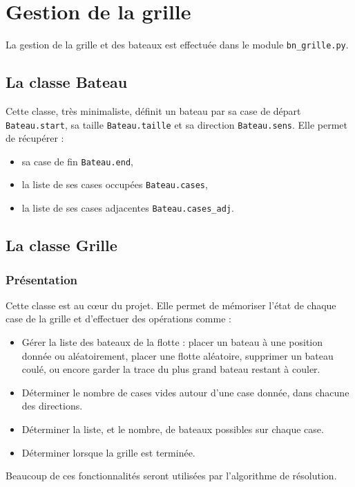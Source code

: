 \chapter{Gestion de la grille}\label{chap_grille}

La gestion de la grille et des bateaux est effectuée dans le module \texttt{bn\_grille.py}.

\section{La classe Bateau}
Cette classe, très minimaliste, définit un bateau par sa case de départ \texttt{Bateau.start}, sa taille \texttt{Bateau.taille} et sa direction \texttt{Bateau.sens}. Elle permet de récupérer :
\begin{itemize}
\item sa case de fin \texttt{Bateau.end},
\item la liste de ses cases occupées \texttt{Bateau.cases},
\item la liste de ses cases adjacentes \texttt{Bateau.cases\_adj}.
\end{itemize}

\section{La classe Grille}
\subsection{Présentation}
Cette classe est au c\oe ur du projet. Elle permet de mémoriser l'état de chaque case de la grille et d'effectuer des opérations comme :
\begin{itemize}
\item Gérer la liste des bateaux de la flotte : placer un bateau à une position donnée ou aléatoirement, placer une flotte aléatoire, supprimer un bateau coulé, ou encore garder la trace du plus grand bateau restant à couler.
\item Déterminer le nombre de cases vides autour d'une case donnée, dans chacune des directions.
\item Déterminer la liste, et le nombre, de bateaux possibles sur chaque case.
\item Déterminer lorsque la grille est terminée.
\end{itemize}
Beaucoup de ces fonctionnalités seront utilisées par l'algorithme de résolution.

\medskip


